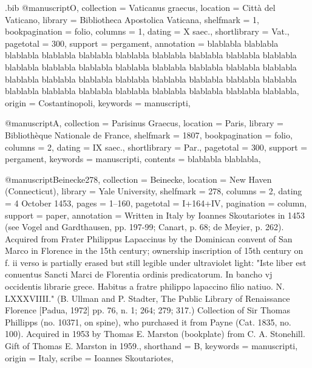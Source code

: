 
\begin{filecontents}{\jobname.bib}
@manuscript{O,
  collection     = {Vaticanus graecus},
  location       = {Città del Vaticano},
  library        = {Bibliotheca Apostolica Vaticana},
  shelfmark      = {1},
  bookpagination = {folio},
  columns        = {1},
  dating         = {X saec.},
  shortlibrary   = {Vat.},
  pagetotal      = {300},
  support        = {pergament},
  annotation     = {blablabla blablabla blablabla blablabla blablabla blablabla blablabla blablabla blablabla blablabla blablabla blablabla blablabla blablabla blablabla blablabla blablabla blablabla blablabla blablabla blablabla blablabla blablabla blablabla blablabla blablabla blablabla blablabla blablabla blablabla blablabla blablabla blablabla blablabla},
  origin         = {Costantinopoli},
  keywords       = {manuscripti},
}

@manuscript{A,
  collection     = {Parisinus Graecus},
  location       = {Paris},
  library        = {Bibliothèque Nationale de France},
  shelfmark      = {1807},
  bookpagination = {folio},
  columns        = {2},
  dating         = {IX saec.},
  shortlibrary   = {Par.},
  pagetotal      = {300},
  support        = {pergament},
  keywords       = {manuscripti},
  contents       = {blablabla blablabla},
}

@manuscript{Beinecke278,
  collection = {Beinecke},
  location   = {New Haven (Connecticut)},
  library    = {Yale University},
  shelfmark  = {278},
  columns    = {2},
  dating     = {4 October 1453},
  pages      = {1\recto--160\recto},
  pagetotal  = {I+164+IV},
  pagination = {column},
  support    = {paper},
  annotation = {Written in Italy by Ioannes Skoutariotes in 1453 (see Vogel and Gardthausen, pp. 197-99; Canart, p. 68; de Meyier, p. 262). Acquired from Frater Philippus Lapaccinus by the Dominican convent of San Marco in Florence in the 15th century; ownership inscription of 15th century on f. ii verso is partially erased but still legible under ultraviolet light: "Iste liber est conuentus Sancti Marci de Florentia ordinis predicatorum. In bancho vj occidentis librarie grece. Habitus a fratre philippo lapaccino filio natiuo. N. LXXXVIIII." (B. Ullman and P. Stadter, The Public Library of Renaissance Florence [Padua, 1972] pp. 76, n. 1; 264; 279; 317.) Collection of Sir Thomas Phillipps (no. 10371, on spine), who purchased it from Payne (Cat. 1835, no. 100). Acquired in 1953 by Thomas E. Marston (bookplate) from C. A. Stonehill. Gift of Thomas E. Marston in 1959.},
  shorthand      = {B},
  keywords   = {manuscripti},
  origin     = {Italy},
  scribe     = {Ioannes Skoutariotes},
}
\end{filecontents}

